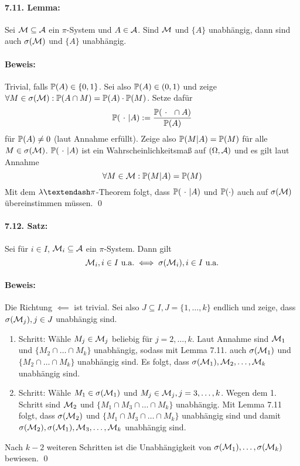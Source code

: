 \paragraph{7.11. Lemma:}Sei $\mathcal{M}\subseteq\mathcal{A}$ ein $\pi$-System und $A\in\mathcal{A}$. Sind $\mathcal{M}$ und $\{A\}$ unabh\"angig, dann sind auch $\sigma(\mathcal{M})$ und $\{A\}$ unabh\"angig. 

\paragraph{Beweis:}Trivial, falls $\mathbb{P}(A)\in\{0,1\}$. Sei also $\mathbb{P}(A)\in(0,1)$ und zeige $\forall M\in\sigma(\mathcal{M}):\mathbb{P}(A\cap M)=\mathbb{P}(A)\cdot\mathbb{P}(M)$. Setze daf\"ur 
$$\Pp(\ \cdot\ | A):=\dfrac{\Pp(\ \cdot \ \cap A)}{\Pp(A)}$$
f\"ur $\mathbb{P}(A)\neq0$ (laut Annahme erf\"ullt). Zeige also $\mathbb{P}(M|A)=\mathbb{P}(M)$ f\"ur alle $M\in\sigma(\mathcal{M})$. $\mathbb{P}(\ \cdot \ |A)$ ist ein Wahrscheinlichkeitsma\ss{} auf $(\Omega,\mathcal{A})$ und es gilt laut Annahme
$$\forall M\in\mathcal{M}:\mathbb{P}(M|A)=\mathbb{P}(M)$$
Mit dem $\lambda\textendash\pi$-Theorem folgt, dass $\mathbb{P}(\ \cdot\ |A)$ und $\mathbb{P}(\cdot)$ auch auf $\sigma(\mathcal{M})$ \"ubereinstimmen m\"ussen. \qed

\paragraph{7.12. Satz:}Sei f\"ur $i\in I$, $\mathcal{M}_i\subseteq\mathcal{A}$ ein $\pi$-System. Dann gilt
$$\mathcal{M}_i,i\in I\text{ u.a.}\iff\sigma(\mathcal{M}_i),i\in I\text{ u.a.}$$

\paragraph{Beweis:}Die Richtung $\impliedby$ ist trivial. Sei also $J\subseteq I,J=\{1,\hdots,k\}$ endlich und zeige, dass $\sigma(\mathcal{M}_j),j\in J$ unabh\"angig sind. 
\begin{enumerate}[label=\arabic*.]
    \item Schritt: W\"ahle $M_j\in\mathcal{M}_j$ beliebig f\"ur $j=2, \hdots,k$. Laut Annahme sind $\mathcal{M}_1$ und $\{M_2\cap\hdots\cap M_k\}$ unabh\"angig, sodass mit Lemma 7.11. auch $\sigma(\mathcal{M}_1)$ und $\{M_2\cap\hdots\cap M_k\}$ unabh\"angig sind. Es folgt, dass $\sigma(\mathcal{M}_1),\mathcal{M}_2,\hdots,\mathcal{M}_k$ unabh\"angig sind.
    \item Schritt: W\"ahle $M_1\in\sigma(\mathcal{M}_1)$ und $M_j\in\mathcal{M}_j,j=3,\hdots,k$. Wegen dem 1. Schritt sind $\mathcal{M}_2$ und $\{M_1\cap M_3\cap\hdots\cap M_k\}$ unabh\"angig. Mit Lemma 7.11 folgt, dass $\sigma(\mathcal{M}_2)$ und $\{M_1\cap M_3\cap\hdots\cap M_k\}$ unabh\"angig sind und damit $\sigma(\mathcal{M}_2),\sigma(\mathcal{M}_1),\mathcal{M}_3,\hdots,\mathcal{M}_k$ unabh\"angig sind. 
\end{enumerate}
Nach $k-2$ weiteren Schritten ist die Unabh\"angigkeit von $\sigma(\mathcal{M}_1),\hdots,\sigma(\mathcal{M}_k)$ bewiesen. \qed

